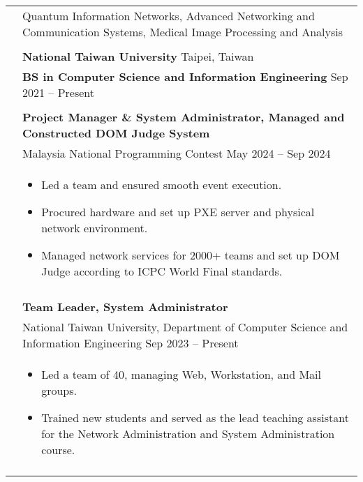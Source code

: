 \documentclass[letterpaper, 11pt]{article}
\begin{document}
\begin{longtable}{p{1.3in}p{4.8in}}

\nohyphens{\color{OliveGreen}{Research Interests}}
& Quantum Information Networks, Advanced Networking and Communication Systems, Medical Image Processing and Analysis \\
& \\

\color{OliveGreen}{Education} 
& \textbf{National Taiwan University} \hfill Taipei, Taiwan \\ 
& \textbf{BS in Computer Science and Information Engineering} \hfill Sep 2021 -- Present \\
& \\

\nohyphens{\color{OliveGreen}{Experience}} 
& \textbf{Project Manager \& System Administrator, Managed and Constructed DOM Judge System} \\
& Malaysia National Programming Contest \hfill May 2024 -- Sep 2024 \\
& \begin{itemize}[noitemsep, leftmargin=*]
    \item Led a team and ensured smooth event execution.
    \item Procured hardware and set up PXE server and physical network environment.
    \item Managed network services for 2000+ teams and set up DOM Judge according to ICPC World Final standards.
\end{itemize} \\
& \\

& \textbf{Team Leader, System Administrator} \\
& National Taiwan University, Department of Computer Science and Information Engineering \hfill Sep 2023 -- Present \\
& \begin{itemize}[noitemsep, leftmargin=*]
    \item Led a team of 40, managing Web, Workstation, and Mail groups.
    \item Trained new students and served as the lead teaching assistant for the Network Administration and System Administration course.
\end{itemize} \\
& \\


\end{longtable}
\end{document}
